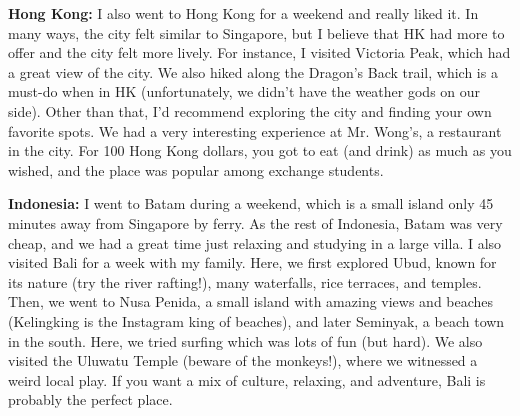 \textbf{Hong Kong:} I also went to Hong Kong for a weekend and really liked it. In many ways, the city felt similar to Singapore, but I believe that HK had more to offer and the city felt more lively. For instance, I visited Victoria Peak, which had a great view of the city. We also hiked along the Dragon's Back trail, which is a must-do when in HK (unfortunately, we didn't have the weather gods on our side). Other than that, I'd recommend exploring the city and finding your own favorite spots. We had a very interesting experience at Mr. Wong's, a restaurant in the city. For 100 Hong Kong dollars, you got to eat (and drink) as much as you wished, and the place was popular among exchange students.

\textbf{Indonesia:} I went to Batam during a weekend, which is a small island only 45 minutes away from Singapore by ferry. As the rest of Indonesia, Batam was very cheap, and we had a great time just relaxing and studying in a large villa. I also visited Bali for a week with my family. Here, we first explored Ubud, known for its nature (try the river rafting!), many waterfalls, rice terraces, and temples. Then, we went to Nusa Penida, a small island with amazing views and beaches (Kelingking is the Instagram king of beaches), and later Seminyak, a beach town in the south. Here, we tried surfing which was lots of fun (but hard). We also visited the Uluwatu Temple (beware of the monkeys!), where we witnessed a weird local play. If you want a mix of culture, relaxing, and adventure, Bali is probably the perfect place.

